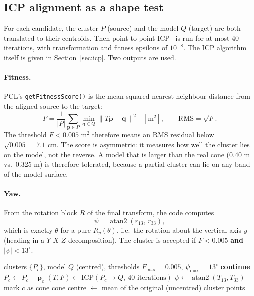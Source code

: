 \documentclass[10pt,a4paper]{scrartcl}
\renewcommand{\emph}[1]{\textcolor{accent}{#1}}
\newcommand{\code}[1]{\texttt{#1}}
\newcommand{\norm}[1]{\left\lVert #1 \right\rVert}
\DeclareMathOperator{\atantwo}{atan2}
\begin{document}
  \subsection{ICP alignment as a shape test}

  For each candidate, the cluster $P$ (source) and the model $Q$ (target) are both
  translated to their centroids. Then point-to-point ICP~\citep{besl1992icp} is run
  for at most 40 iterations, with transformation and fitness epsilons of $10^{-8}$.
  The ICP algorithm itself is given in Section~\ref{sec:icp}. Two outputs are used.

  \paragraph{Fitness.} PCL's \code{getFitnessScore()} is the mean \emph{squared}
  nearest-neighbour distance from the aligned source to the target:
  \begin{equation}
    F=\frac1{|P|}\sum_{\bm p\in P}\min_{\bm q\in Q}\norm{T\bm p-\bm q}^2\quad[\text{m}^2],\qquad
    \text{RMS}=\sqrt F .
  \end{equation}
  The threshold $F<0.005$ m$^2$ therefore means an RMS residual below
  $\sqrt{0.005}=7.1$ cm. The score is \emph{asymmetric}: it measures how well the
  cluster lies on the model, not the reverse. A model that is larger than the real
  cone (0.40 m vs.\ 0.325 m) is therefore tolerated, because a partial cluster can lie
  on any band of the model surface.

  \paragraph{Yaw.} From the rotation block $R$ of the final transform, the code
  computes
  \begin{equation}
    \psi=\atantwo(r_{13},\,r_{33}),
  \end{equation}
  which is exactly $\theta$ for a pure $R_y(\theta)$, i.e.\ the rotation about the
  vertical axis $y$ (heading in a $Y$-$X$-$Z$ decomposition). The cluster is accepted
  if $F<0.005$ \textbf{and} $|\psi|<13^\circ$.

  \begin{algorithm}[H]
  \caption{Cone classification (\code{processClusterForConeDetection})}
  \begin{algorithmic}[1]
  \Require clusters $\{P_c\}$, model $Q$ (centred), thresholds $F_{\max}=0.005$, $\psi_{\max}=13^\circ$
     \textbf{continue} \EndIf
    \State $P_c\gets P_c-\bar{\bm p}_c$ 
    \State $(T,F)\gets\mathrm{ICP}(P_c\to Q,\ 40\text{ iterations})$
    \State $\psi\gets\atantwo(T_{13},T_{33})$
     mark $c$ as cone \EndIf
  \EndFor
  \State cone centre $\gets$ mean of the original (uncentred) cluster points
  \end{algorithmic}
  \end{algorithm}
\end{document}
